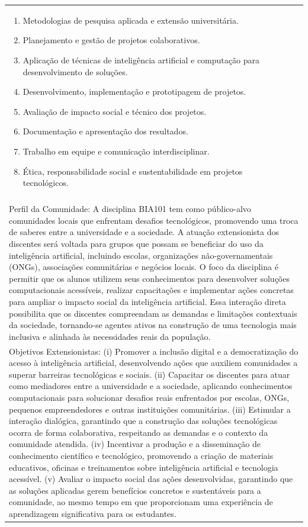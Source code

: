 \documentclass[11pt]{article}
\begin{document}
\begin{center}
\begin{longtable}{|p{4cm}|p{4cm}|p{4cm}|p{4cm}|}
{\begin{enumerate}
\item Metodologias de pesquisa aplicada e extensão universitária.
\item Planejamento e gestão de projetos colaborativos.
\item Aplicação de técnicas de inteligência artificial e computação para desenvolvimento de soluções.
\item Desenvolvimento, implementação e prototipagem de projetos.
\item Avaliação de impacto social e técnico dos projetos.
\item Documentação e apresentação dos resultados.
\item Trabalho em equipe e comunicação interdisciplinar.
\item Ética, responsabilidade social e sustentabilidade em projetos tecnológicos.\end{enumerate}}\\
\multicolumn{4}{|p{16cm}|}{}\\
\multicolumn{4}{|p{16cm}|}{Perfil da Comunidade: A disciplina BIA101 tem como público-alvo comunidades locais que enfrentam desafios tecnológicos, promovendo uma troca de saberes entre a universidade e a sociedade. A atuação extensionista dos discentes será voltada para grupos que possam se beneficiar do uso da inteligência artificial, incluindo escolas, organizações não-governamentais (ONGs), associações comunitárias e negócios locais. O foco da disciplina é permitir que os alunos utilizem seus conhecimentos para desenvolver soluções computacionais acessíveis, realizar capacitações e implementar ações concretas para ampliar o impacto social da inteligência artificial. Essa interação direta possibilita que os discentes compreendam as demandas e limitações contextuais da sociedade, tornando-se agentes ativos na construção de uma tecnologia mais inclusiva e alinhada às necessidades reais da população.}\\
\multicolumn{4}{|p{16cm}|}{Objetivos Extensionistas: (i) Promover a inclusão digital e a democratização do acesso à inteligência artificial, desenvolvendo ações que auxiliem comunidades a superar barreiras tecnológicas e sociais. (ii) Capacitar os discentes para atuar como mediadores entre a universidade e a sociedade, aplicando conhecimentos computacionais para solucionar desafios reais enfrentados por escolas, ONGs, pequenos empreendedores e outras instituições comunitárias. (iii) Estimular a interação dialógica, garantindo que a construção das soluções tecnológicas ocorra de forma colaborativa, respeitando as demandas e o contexto da comunidade atendida. (iv) Incentivar a produção e a disseminação de conhecimento científico e tecnológico, promovendo a criação de materiais educativos, oficinas e treinamentos sobre inteligência artificial e tecnologia acessível. (v) Avaliar o impacto social das ações desenvolvidas, garantindo que as soluções aplicadas gerem benefícios concretos e sustentáveis para a comunidade, ao mesmo tempo em que proporcionam uma experiência de aprendizagem significativa para os estudantes.}\\

\end{longtable}
\end{center}
\end{document}
